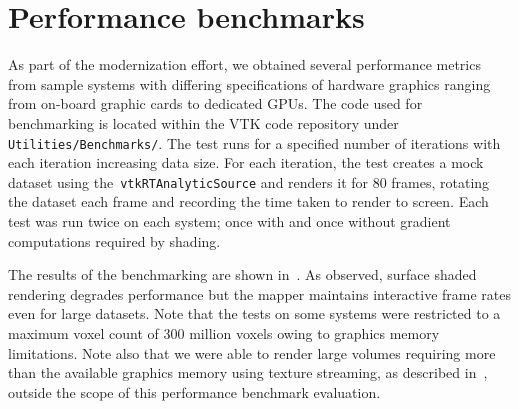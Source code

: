 \section{Performance benchmarks}
\label{performance-benchmarks}
As part of the modernization effort, we obtained several performance metrics
from sample systems with differing specifications of hardware graphics ranging
from on-board graphic cards to dedicated GPUs. The code used for benchmarking is
located within the VTK code repository under \texttt{Utilities/Benchmarks/}. The
test runs for a specified number of iterations with each iteration increasing
data size. For each iteration, the test creates a mock dataset using
the~\texttt{vtkRTAnalyticSource} and renders it for 80 frames, rotating the
dataset each frame and recording the time taken to render to screen.  Each test
was run twice on each system; once with and once without gradient computations
required by shading.

The results of the benchmarking are shown in~. As observed,
surface shaded rendering degrades performance but the mapper maintains
interactive frame rates even for large datasets. Note that the tests on some
systems were restricted to a maximum voxel count of 300 million voxels owing to
graphics memory limitations. Note also that we were able to render large volumes
requiring more than the available graphics memory using texture streaming, as
described in~, outside the scope of this performance
benchmark evaluation.

